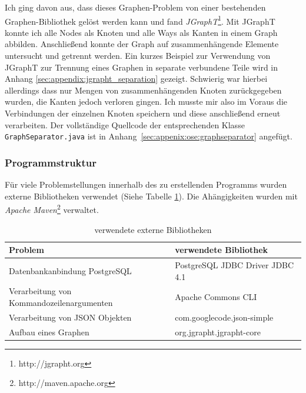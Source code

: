 Ich ging davon aus, dass dieses Graphen-Problem von einer bestehenden Graphen-Bibliothek gelöst werden kann und fand \textit{JGraphT}\footnote{http://jgrapht.org}.
Mit JGraphT konnte ich alle Nodes als Knoten und alle Ways als Kanten in einem Graph abbilden.
Anschließend konnte der Graph auf zusammenhängende Elemente untersucht und getrennt werden.
Ein kurzes Beispiel zur Verwendung von JGraphT zur Trennung eines Graphen in separate verbundene Teile wird in Anhang \ref{sec:appendix:jgrapht_separation} gezeigt.
Schwierig war hierbei allerdings dass nur Mengen von zusammenhängenden Knoten zurückgegeben wurden, die Kanten jedoch verloren gingen.
Ich musste mir also im Voraus die Verbindungen der einzelnen Knoten speichern und diese anschließend erneut verarbeiten.
Der vollständige Quellcode der entsprechenden Klasse \texttt{GraphSeparator.java} ist in Anhang~\ref{sec:appenix:ose:graphseparator} angefügt.

\subsubsection{Programmstruktur}
Für viele Problemstellungen innerhalb des zu erstellenden Programms wurden externe Bibliotheken verwendet (Siehe Tabelle \ref{tab:OsmosisStreetExtractor:Libraries}).
Die Ahängigkeiten wurden mit \textit{Apache Maven}\footnote{http://maven.apache.org} verwaltet.
\begin{table}[htb]
\centering
\caption{verwendete externe Bibliotheken}
\label{tab:OsmosisStreetExtractor:Libraries}
\begin{tabular}{|l|l|}
\hline
\textbf{Problem}                          & \textbf{verwendete Bibliothek}     \\ \hline
Datenbankanbindung PostgreSQL             & PostgreSQL JDBC Driver JDBC 4.1    \\ \hline
Verarbeitung von Kommandozeilenargumenten & Apache Commons CLI                 \\ \hline
Verarbeitung von JSON Objekten            & com.googlecode.json-simple         \\ \hline
Aufbau eines Graphen                      & org.jgrapht.jgrapht-core           \\ \hline
\end{tabular}
\end{table}

